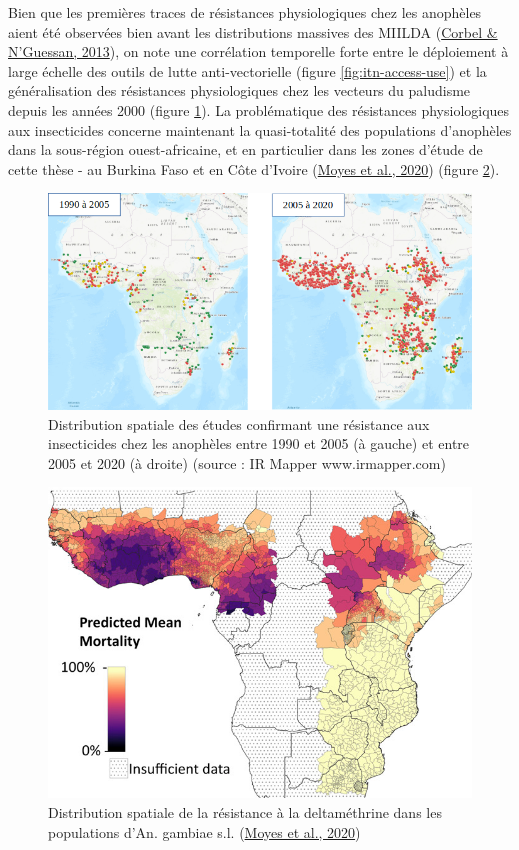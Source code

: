 \documentclass[12pt,twoside]{reedthesis}
\begin{document}
Bien que les premières traces de résistances physiologiques chez les anophèles aient été observées bien avant les distributions massives des MIILDA (\protect\hyperlink{ref-corbel_distribution_2013}{Corbel \& N'Guessan, 2013}), on note une corrélation temporelle forte entre le déploiement à large échelle des outils de lutte anti-vectorielle (figure \ref{fig:itn-access-use}) et la généralisation des résistances physiologiques chez les vecteurs du paludisme depuis les années 2000 (figure \ref{fig:dev-res-phy}). La problématique des résistances physiologiques aux insecticides concerne maintenant la quasi-totalité des populations d'anophèles dans la sous-région ouest-africaine, et en particulier dans les zones d'étude de cette thèse - au Burkina Faso et en Côte d'Ivoire (\protect\hyperlink{ref-moyes_evaluating_2020}{Moyes et al., 2020}) (figure \ref{fig:dev-res-phy-map}).\\
\begin{figure}

{\centering \includegraphics[width=1\linewidth]{figure/dev_res_phy} 

}

\caption[Distribution spatiale de l'émergence et expansion des résistances physiologiques des vecteurs aux insecticides]{Distribution spatiale des études confirmant une résistance aux insecticides chez les anophèles entre 1990 et 2005 (à gauche) et entre 2005 et 2020 (à droite) (source : IR Mapper www.irmapper.com)}\label{fig:dev-res-phy}
\end{figure}
\begin{figure}

{\centering \includegraphics[width=0.5\linewidth]{figure/dev_res_phy_map} 

}

\caption[Distribution spatiale de la résistance à la deltaméthrine dans les populations d'An. gambiae s.l.]{Distribution spatiale de la résistance à la deltaméthrine dans les populations d'An. gambiae s.l. (\protect\hyperlink{ref-moyes_evaluating_2020}{Moyes et al., 2020})}\label{fig:dev-res-phy-map}
\end{figure}
\end{document}
